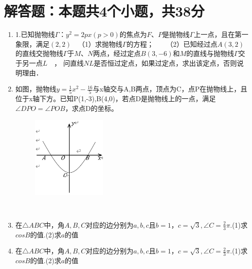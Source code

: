 \documentclass[12pt,twoside,space]{ctexart}
\begin{document}
\section{解答题：本题共4个小题，共38分}
\begin{enumerate}[itemsep=0.2em,topsep=0pt]
\item
1.已知抛物线$ \Gamma $：$ y^2=2px(p>0) $的焦点为$ F $、$ P $是抛物线$ \Gamma $上一点，且在第一象限，满足$ (2,2) $  （1）求抛物线$ \Gamma $的方程；    （2）已知经过点$ A $$ (3,2) $的直线交抛物线$ \Gamma $于$ M、N $两点，经过定点$ B $$ (3,-6) $和$ M $的直线与抛物线$ \Gamma $交于另一点$ L $  ， 问直线$ NL $是否恒过定点，如果过定点，求出该定点，否则说明理由．
\item
如图，抛物线$ y=\frac{1}{5}x^2-\frac{16}{5} $与x轴交与A,B两点，顶点为C，点P在抛物线上，且位于x轴下方。已知P(1,-3),B(4,0)，若点D是抛物线上的一点，满足$ \angle DPO=\angle POB $，求点D的坐标。
\begin{figure}[htbp]
                      \centering
                      \includegraphics[width=10em]{288793-1630484678-2.jpg}
\end{figure}\\[-1.5em]
\item
在$\triangle ABC$中，角$A,B,C$对应的边分别为$a,b,c$且$b=1，c=\sqrt{3},\angle C=\frac{2}{3}\pi.$(1)求$cosB$的值.(2)求$a$的值
\item
在$\triangle ABC$中，角$A,B,C$对应的边分别为$a,b,c$且$b=1，c=\sqrt{3},\angle C=\frac{2}{3}\pi.$(1)求$cosB$的值.(2)求$a$的值
\end{enumerate}

\clearpage
\end{document}
